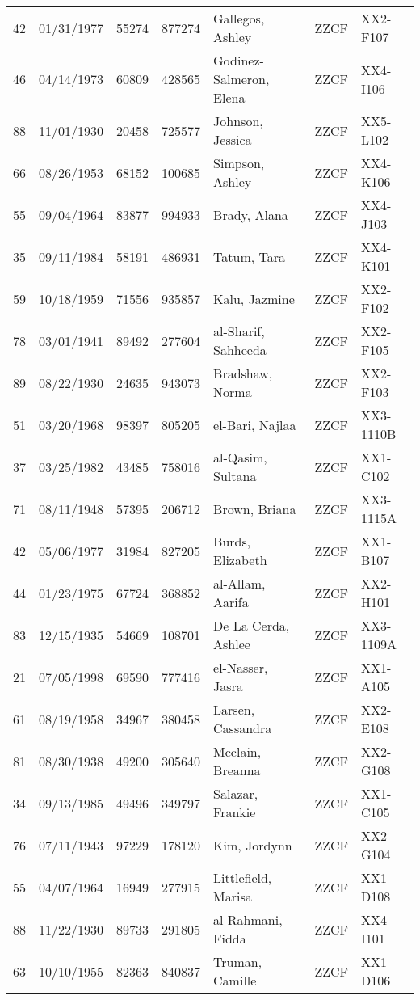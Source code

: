 \documentclass[]{article}
\begin{document}
\begin{tabular}{cccclll}
   42 & 01/31/1977 & 55274 & 877274 & Gallegos, Ashley & ZZCF & XX2-F107 \\ 
   46 & 04/14/1973 & 60809 & 428565 & Godinez-Salmeron, Elena & ZZCF & XX4-I106 \\ 
   88 & 11/01/1930 & 20458 & 725577 & Johnson, Jessica & ZZCF & XX5-L102 \\ 
   66 & 08/26/1953 & 68152 & 100685 & Simpson, Ashley & ZZCF & XX4-K106 \\ 
   55 & 09/04/1964 & 83877 & 994933 & Brady, Alana & ZZCF & XX4-J103 \\ 
   35 & 09/11/1984 & 58191 & 486931 & Tatum, Tara & ZZCF & XX4-K101 \\ 
   59 & 10/18/1959 & 71556 & 935857 & Kalu, Jazmine & ZZCF & XX2-F102 \\ 
   78 & 03/01/1941 & 89492 & 277604 & al-Sharif, Sahheeda & ZZCF & XX2-F105 \\ 
   89 & 08/22/1930 & 24635 & 943073 & Bradshaw, Norma & ZZCF & XX2-F103 \\ 
   51 & 03/20/1968 & 98397 & 805205 & el-Bari, Najlaa & ZZCF & XX3-1110B \\ 
   37 & 03/25/1982 & 43485 & 758016 & al-Qasim, Sultana & ZZCF & XX1-C102 \\ 
   71 & 08/11/1948 & 57395 & 206712 & Brown, Briana & ZZCF & XX3-1115A \\ 
   42 & 05/06/1977 & 31984 & 827205 & Burds, Elizabeth & ZZCF & XX1-B107 \\ 
   44 & 01/23/1975 & 67724 & 368852 & al-Allam, Aarifa & ZZCF & XX2-H101 \\ 
   83 & 12/15/1935 & 54669 & 108701 & De La Cerda, Ashlee & ZZCF & XX3-1109A \\ 
   21 & 07/05/1998 & 69590 & 777416 & el-Nasser, Jasra & ZZCF & XX1-A105 \\ 
   61 & 08/19/1958 & 34967 & 380458 & Larsen, Cassandra & ZZCF & XX2-E108 \\ 
   81 & 08/30/1938 & 49200 & 305640 & Mcclain, Breanna & ZZCF & XX2-G108 \\ 
   34 & 09/13/1985 & 49496 & 349797 & Salazar, Frankie & ZZCF & XX1-C105 \\ 
   76 & 07/11/1943 & 97229 & 178120 & Kim, Jordynn & ZZCF & XX2-G104 \\ 
   55 & 04/07/1964 & 16949 & 277915 & Littlefield, Marisa & ZZCF & XX1-D108 \\ 
   88 & 11/22/1930 & 89733 & 291805 & al-Rahmani, Fidda & ZZCF & XX4-I101 \\ 
   63 & 10/10/1955 & 82363 & 840837 & Truman, Camille & ZZCF & XX1-D106 \\ 

\end{tabular}
\end{document}
